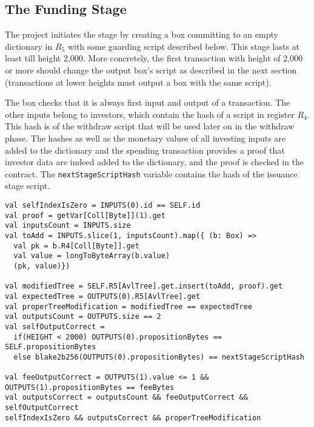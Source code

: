 \documentclass[11pt]{article}
\begin{document}
\subsection{The Funding Stage}
The project initiates the stage by creating a box committing to an empty dictionary in $R_5$ with some guarding script described below. This stage lasts at least till height 2,000. More concretely, the first transaction with height of 2,000 or more should change the output box's script as described in the next section (transactions at lower heights must output a box with the same script).

The box checks that it is always first input and output of a transaction. The other inputs belong to investors, which contain the hash of a script in register $R_4$. This hash is of the withdraw script that will be used later on in the withdraw phase. The hashes as well as the monetary values of all investing inputs are added to the dictionary and the spending transaction provides a proof that investor data are indeed added to the dictionary, and the proof is checked in the contract.
The \texttt{nextStageScriptHash} variable contains the hash of the issuance stage script.
\begin{verbatim}
val selfIndexIsZero = INPUTS(0).id == SELF.id
val proof = getVar[Coll[Byte]](1).get
val inputsCount = INPUTS.size
val toAdd = INPUTS.slice(1, inputsCount).map({ (b: Box) =>
  val pk = b.R4[Coll[Byte]].get
  val value = longToByteArray(b.value)
  (pk, value)})

val modifiedTree = SELF.R5[AvlTree].get.insert(toAdd, proof).get
val expectedTree = OUTPUTS(0).R5[AvlTree].get
val properTreeModification = modifiedTree == expectedTree
val outputsCount = OUTPUTS.size == 2
val selfOutputCorrect = 
  if(HEIGHT < 2000) OUTPUTS(0).propositionBytes == SELF.propositionBytes
  else blake2b256(OUTPUTS(0).propositionBytes) == nextStageScriptHash

val feeOutputCorrect = OUTPUTS(1).value <= 1 && OUTPUTS(1).propositionBytes == feeBytes
val outputsCorrect = outputsCount && feeOutputCorrect && selfOutputCorrect
selfIndexIsZero && outputsCorrect && properTreeModification
\end{verbatim}
\end{document}
